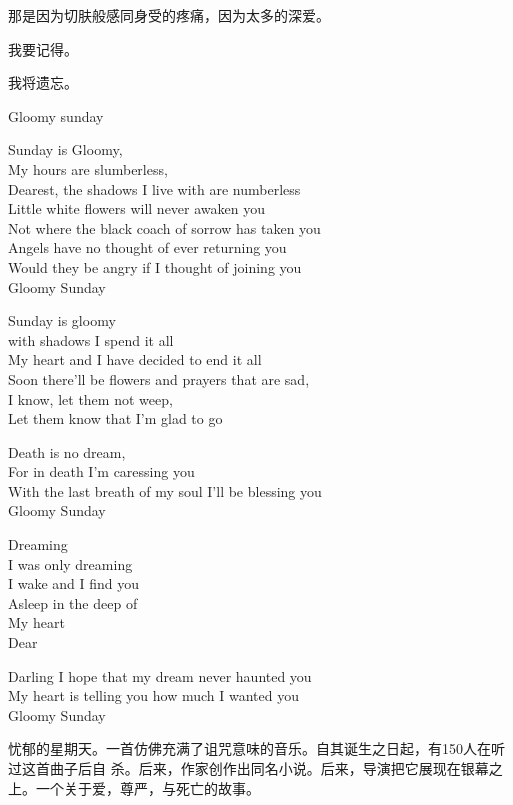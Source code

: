 		那是因为切肤般感同身受的疼痛，因为太多的深爱。

		我要记得。

		我将遗忘。

	\endwriting



		\longpoem{}{}{}

			Gloomy sunday

			Sunday is Gloomy, \\
			My hours are slumberless, \\
			Dearest, the shadows I live with are numberless \\
			Little white flowers will never awaken you \\
			Not where the black coach of sorrow has taken you \\
			Angels have no thought of ever returning you \\
			Would they be angry if I thought of joining you \\
			Gloomy Sunday

			Sunday is gloomy \\
			with shadows I spend it all \\
			My heart and I have decided to end it all \\
			Soon there’ll be flowers and prayers that are sad, \\
			I know, let them not weep, \\
			Let them know that I’m glad to go

			Death is no dream, \\
			For in death I’m caressing you \\
			With the last breath of my soul I’ll be blessing you \\
			Gloomy Sunday

			Dreaming \\
			I was only dreaming \\
			I wake and I find you \\
			Asleep in the deep of \\
			My heart \\
			Dear

			Darling I hope that my dream never haunted you \\
			My heart is telling you how much I wanted you \\
			Gloomy Sunday
		\endlongpoem

		忧郁的星期天。一首仿佛充满了诅咒意味的音乐。自其诞生之日起，有150人在听过这首曲子后自
	杀。后来，作家创作出同名小说。后来，导演把它展现在银幕之上。一个关于爱，尊严，与死亡的故事。

